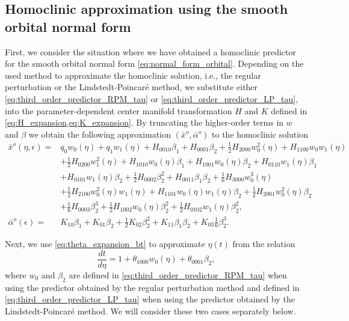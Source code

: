 \subsection{Homoclinic approximation using the smooth orbital normal form}
First, we consider the situation where we have obtained a homoclinic predictor for
the smooth orbital normal form \cref{eq:normal_form_orbital}. Depending on the
used method to approximate the homoclinic solution, i.e., the regular perturbation
or the Lindstedt-Poincar\'e method, we substitute either
\cref{eq:third_order_predictor_RPM_tau} or
\cref{eq:third_order_predictor_LP_tau}, into the parameter-dependent center manifold
transformation $H$ and $K$ defined in \cref{eq:H_expansion,eq:K_expansion}.
By truncating the higher-order terms in $w$ and $\beta$ we obtain the following
approximation $(\bar x^o, \bar \alpha^o)$ to the homoclinic solution
\begin{align}
\label{eq:x_eta_espilon} 
\bar x^o(\eta, \epsilon)={}& q_0w_0(\eta) + q_1w_1(\eta) + H_{0010}\beta_1 + H_{0001} \beta_2 
+ \frac12 H_{2000}w_0^2(\eta) + H_{1100}w_0w_1(\eta) \\
                         & + \frac12 H_{0200}w_1^2(\eta) + H_{1010}w_0(\eta)\beta_1 + H_{1001}w_0(\eta)\beta_2 + H_{0110}w_1(\eta)\beta_1 \nonumber \\
                         & + H_{0101}w_1(\eta)\beta_2 + \frac12 H_{0002}\beta_2^2+ H_{0011}\beta_1\beta_2 + \frac16 H_{3000}w_0^3(\eta) \nonumber \\
                         & + \frac12 H_{2100}w_0^2(\eta)w_1(\eta) + H_{1101}w_0(\eta)w_1(\eta)\beta_2 + \frac12 H_{2001}w_0^2(\eta)\beta_2 \nonumber \\
                         & + \frac{1}{6}H_{0003}\beta_2^3 + \frac12 H_{1002}w_0(\eta)\beta_2^2 + \frac12 H_{0102}w_1(\eta)\beta_2^2, \nonumber \\
\label{eq:alpha_espilon}
\bar \alpha^o(\epsilon) ={}& K_{10}\beta_1 + K_{01}\beta_2 + \frac{1}{2}K_{02}\beta_2^{2} + K_{11}\beta_1\beta_2 + K_{03} \frac16 \beta_2^3.
\end{align}

Next, we use \cref{eq:theta_expansion_bt} to approximate $\eta(t)$ from the relation
\begin{equation}
    \label{eq:dt_deta}
		\frac{dt}{d\eta} = 1 + \theta_{1000}w_0(\eta) + \theta_{0001}\beta_2,
\end{equation}
where $w_0$ and $\beta_2$ are defined in \cref{eq:third_order_predictor_RPM_tau}
when using the predictor obtained by the regular perturbation method and
defined in \cref{eq:third_order_predictor_LP_tau} when using the predictor
obtained by the Lindstedt-Poincar\'e method. We will consider these two
cases separately below.  

